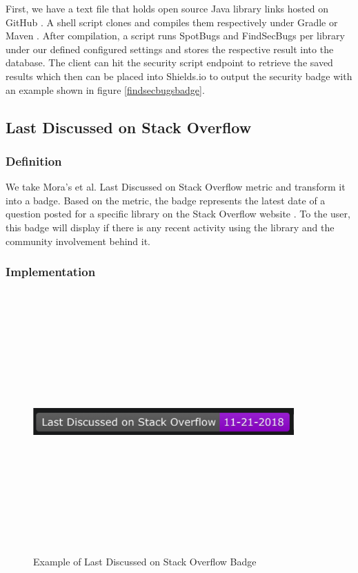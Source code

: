 \documentclass[12pt, letterpaper]{article}
\begin{document}
First, we have a text file that holds open source Java library links hosted on GitHub \cite{github}.
A shell script clones and compiles them respectively under Gradle \cite{gradle} or Maven \cite{maven}.
After compilation, a script runs SpotBugs and FindSecBugs per library under our defined configured settings
and stores the respective result
into the database. The client can hit the security script endpoint to retrieve the saved results which
then can be placed into Shields.io \cite{shields} to output the security badge with an example shown in figure \ref{findsecbugsbadge}. 


\subsection{Last Discussed on Stack Overflow}
\subsubsection{Definition}
We take Mora's et al. \cite{metrics} Last Discussed on Stack Overflow metric and transform it 
into a badge. Based on the metric, the badge represents the latest date of a question posted for a specific
library on the Stack Overflow website \cite{stackoverflow}.
To the user, this badge will display if there is any recent activity using the library and the community
involvement behind it.  

\subsubsection{Implementation}

\begin{figure}[!htb]
    \centerline{
        \includegraphics[width=10cm,height=10cm,keepaspectratio=true]{lastdiscussedbadge}
    }
    \caption{
        Example of Last Discussed on Stack Overflow Badge
    }
    \label{lastdiscussed}
\end{figure}
\end{document}

